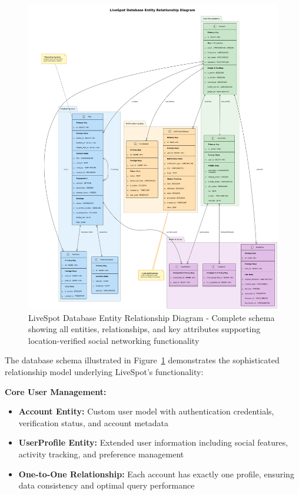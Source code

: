 \begin{figure}[p]
    \centering
    \includegraphics[width=\textwidth,height=0.9\textheight,keepaspectratio]{figures/database_erd}
    \caption{LiveSpot Database Entity Relationship Diagram - Complete schema showing all entities, relationships, and key attributes supporting location-verified social networking functionality}
    \label{fig:database_erd}
\end{figure}

\clearpage

The database schema illustrated in Figure~\ref{fig:database_erd} demonstrates the sophisticated relationship model underlying LiveSpot's functionality:

\textbf{Core User Management:}
\begin{itemize}
    \item \textbf{Account Entity:} Custom user model with authentication credentials, verification status, and account metadata
    \item \textbf{UserProfile Entity:} Extended user information including social features, activity tracking, and preference management
    \item \textbf{One-to-One Relationship:} Each account has exactly one profile, ensuring data consistency and optimal query performance
\end{itemize}

